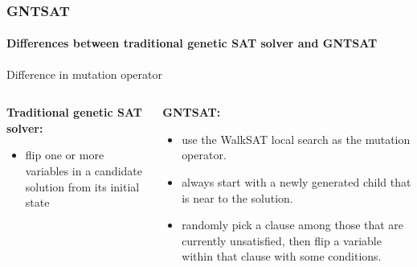 \begin{frame}[t]
	\frametitle{GNTSAT}
	\framesubtitle{Differences between traditional genetic SAT solver and GNTSAT}
	\begin{block}{Difference in mutation operator}
		\begin{columns}[t]
			\begin{column}{0.5\textwidth}
				\textbf{Traditional genetic SAT solver:}
				\begin{itemize}
				\item flip one or more variables in a candidate solution from its initial state
				\end{itemize}
			\end{column}
			\begin{column}{0.5\textwidth}
				\textbf{GNTSAT:}
				\begin{itemize}
				\item use the WalkSAT local search as the mutation operator.
				\item always start with a newly generated child that is near to the solution.
				\item randomly pick a clause among those that are currently unsatisfied, then flip a variable within that clause with some conditions.
				\end{itemize}
				\end{column}
			\end{columns}
	\end{block}
\end{frame}
